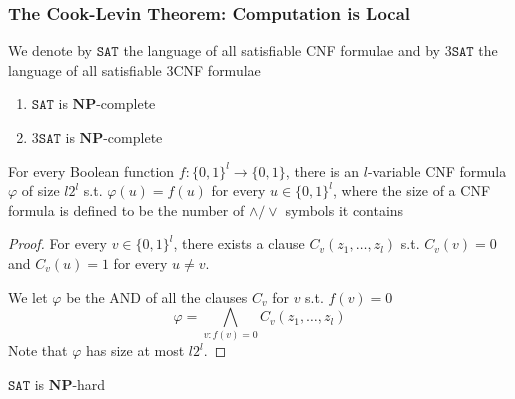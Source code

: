 \documentclass[11pt]{article}
\def \NP {\textbf{NP}}
\def \SAT {\text{SAT}}
\def \NP {\textbf{NP}}
\def \SAT {\texttt{SAT}}
\begin{document}
\subsubsection{The Cook-Levin Theorem: Computation is Local}
\label{sec:org5d4099e}
We denote by \(\SAT\) the language of all satisfiable CNF formulae and by \(3\SAT\) the
language of all satisfiable 3CNF formulae

\begin{theorem}
\label{thm2.10}
\begin{enumerate}
\item \(\SAT\) is \(\NP\)-complete
\item \(3\SAT\) is \(\NP\)-complete
\end{enumerate}
\end{theorem}

\begin{lemma}
\label{lemma2.13}
For every Boolean function \(f:\{0,1\}^l\to\{0,1\}\), there is an \(l\)-variable CNF formula \(\varphi\)
of size \(l2^l\) s.t. \(\varphi(u)=f(u)\) for every \(u\in\{0,1\}^l\), where the size of a CNF
formula is defined to be the number of \(\wedge/\vee\) symbols it contains
\end{lemma}

\begin{proof}
For every \(v\in\{0,1\}^l\), there exists a clause \(C_v(z_1,\dots,z_l)\) s.t. \(C_v(v)=0\)
and \(C_v(u)=1\) for every \(u\neq v\).

We let \(\varphi\) be the AND of all the clauses \(C_v\) for \(v\) s.t. \(f(v)=0\)
     \begin{equation*}
\varphi=\bigwedge_{v:f(v)=0}C_v(z_1,\dots,z_l)
     \end{equation*}
Note that \(\varphi\) has size at most \(l2^l\).
\end{proof}

\begin{lemma}[]
\(\SAT\) is \(\NP\)-hard
\end{lemma}
\end{document}

